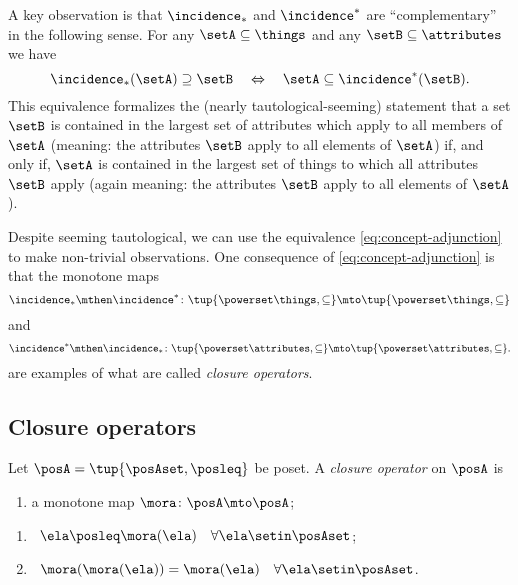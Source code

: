 A key observation is that $\incidence_*$ and $\incidence^*$ are ``complementary'' in the following sense. For any $\setA \subseteq \things$ and any $\setB \subseteq \attributes$ we have 
\begin{equation}\label{eq:concept-adjunction}
\incidence_*(\setA) \supseteq \setB \quad \Leftrightarrow \quad \setA \subseteq \incidence^*(\setB).
\end{equation}
This equivalence formalizes the (nearly tautological-seeming) statement that a set $\setB$ is contained in the largest set of attributes which apply to all members of $\setA$ (meaning: the attributes $\setB$ apply to all elements of $\setA$) if, and only if, $\setA$ is contained in the largest set of things to which all attributes $\setB$ apply (again meaning: the attributes $\setB$ apply to all elements of $\setA$). 

Despite seeming tautological, we can use the equivalence \cref{eq:concept-adjunction} to make non-trivial observations. One consequence of \cref{eq:concept-adjunction} is that the monotone maps 
\begin{equation}\label{eq:fca-closure-operator-things}
\incidence_* \mthen \incidence^* \colon \tup{\powerset \things, \subseteq} \mto \tup{\powerset \things, \subseteq}
\end{equation}
and 
\begin{equation}\label{eq:fca-closure-operator-attributes}
\incidence^* \mthen \incidence_* \colon \tup{\powerset \attributes, \subseteq} \mto \tup{\powerset \attributes, \subseteq}.
\end{equation}
are examples of what are called \emph{closure operators}.


\subsection{Closure operators}

\begin{definition}
Let $\posA = \tup{\posAset, \posleq}$ be poset. A \emph{closure operator} on $\posA$ is

\constit
\begin{enumerate}
\item a monotone map $\mora \colon \posA \mto \posA$; 
\end{enumerate}

\condit
\begin{enumerate}
\item {} \  $\ela \posleq \mora(\ela) \quad \forall \ela \setin \posAset$;
\item {} \ $\mora (\mora(\ela)) =  \mora(\ela) \quad \forall \ela \setin \posAset$. 
\end{enumerate}



\end{definition}

